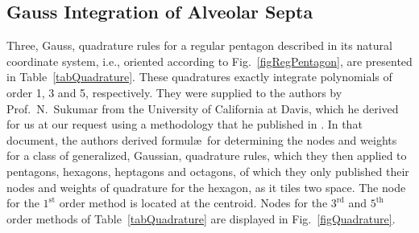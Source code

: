 \subsection{Gauss Integration of Alveolar Septa}

Three, Gauss, quadrature rules for a regular pentagon described in its natural coordinate system, i.e., oriented according to Fig.~\ref{figRegPentagon}, are presented in Table~\ref{tabQuadrature}.  These quadratures exactly integrate polynomials of order 1, 3 and 5, respectively.  They were supplied to the authors by Prof.\ N.\ Sukumar from the University of California at Davis, which he derived for us at our request using a methodology that he published in \cite{Mousavietal10}.  In that document, the authors derived formul\ae\ for determining the nodes and weights for a class of generalized, Gaussian, quadrature rules, which they then applied to pentagons, hexagons, heptagons and octagons, of which they only published their nodes and weights of quadrature for the hexagon, as it tiles two space.  The node for the $1^{\mathrm{st}}$ order method is located at the centroid.  Nodes for the $3^{\mathrm{rd}}$ and $5^{\mathrm{th}}$ order methods of Table~\ref{tabQuadrature} are displayed in Fig.~\ref{figQuadrature}.

